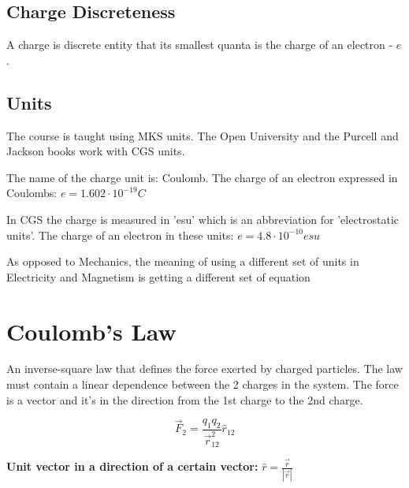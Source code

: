 \documentclass[]{book}
\begin{document}
	\subsection*{Charge Discreteness}
	
	A charge is discrete entity that its smallest quanta is the charge of an electron - \textbf{$e$}.
	
	\subsection*{Units}
	The course is taught using MKS units. The Open University and the Purcell and Jackson books work with CGS units.
	
	The name of the charge unit is: Coulomb. The charge of an electron expressed in Coulombs: $e = 1.602 \cdot 10^{-19}C$
	
	In CGS the charge is measured in 'esu' which is an abbreviation for 'electrostatic units'. The charge of an electron in these units: $e = 4.8 \cdot 10^{-10} esu$
	
	As opposed to Mechanics, the meaning of using a different set of units in Electricity and Magnetism is getting a different set of equation
	
	\section{Coulomb's Law}
	
	An inverse-square law that defines the force exerted by charged particles. The law must contain a linear dependence between the 2 charges in the system. The force is a vector and it's in the direction from the 1st charge to the 2nd charge.
	
	\begin{equation}
	\vec{F}_2 = \frac{q_1 q_2}{\vec{r}_{12}^2}\hat{r}_{12}
	\end{equation}
	
	\textbf{Unit vector in a direction of a certain vector:} $\hat{r} = \frac{\vec{r}}{|\vec{r}|}$
\end{document}
